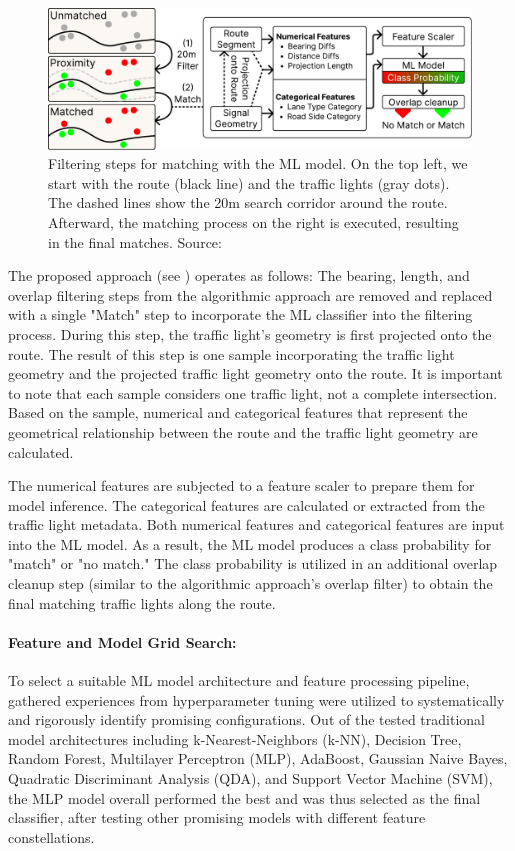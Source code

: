 \begin{figure}[t]
\centering
\includegraphics[width=\linewidth]{images/sg-matching-ml-model.pdf}
\caption{Filtering steps for matching with the ML model. On the top left, we start with the route (black line) and the traffic lights (gray dots). The dashed lines show the 20m search corridor around the route. Afterward, the matching process on the right is executed, resulting in the final matches. Source: \cite{matthes2023geo}}
\label{fig:sg-matching-ml-model}
\end{figure}

The proposed approach (see ) operates as follows: The bearing, length, and overlap filtering steps from the algorithmic approach are removed and replaced with a single "Match" step to incorporate the ML classifier into the filtering process. During this step, the traffic light's geometry is first projected onto the route. The result of this step is one sample incorporating the traffic light geometry and the projected traffic light geometry onto the route. It is important to note that each sample considers one traffic light, not a complete intersection. Based on the sample, numerical and categorical features that represent the geometrical relationship between the route and the traffic light geometry are calculated.

The numerical features are subjected to a feature scaler to prepare them for model inference. The categorical features are calculated or extracted from the traffic light metadata. Both numerical features and categorical features are input into the ML model. As a result, the ML model produces a class probability for "match" or "no match." The class probability is utilized in an additional overlap cleanup step (similar to the algorithmic approach's overlap filter) to obtain the final matching traffic lights along the route.

\paragraph{Feature and Model Grid Search:} To select a suitable ML model architecture and feature processing pipeline, gathered experiences from hyperparameter tuning were utilized to systematically and rigorously identify promising configurations. Out of the tested traditional model architectures including k-Nearest-Neighbors (k-NN), Decision Tree, Random Forest, Multilayer Perceptron (MLP), AdaBoost, Gaussian Naive Bayes, Quadratic Discriminant Analysis (QDA), and Support Vector Machine (SVM), the MLP model overall performed the best and was thus selected as the final classifier, after testing other promising models with different feature constellations. 

